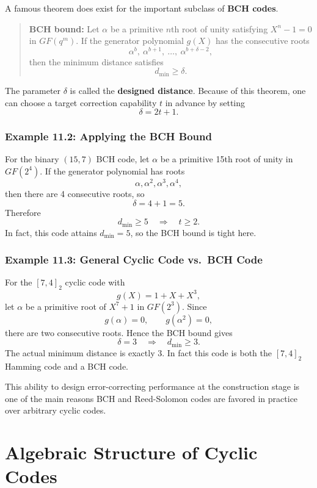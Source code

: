 \documentclass[11pt,oneside]{book}
\theoremstyle{plain}
\theoremstyle{definition}
\theoremstyle{remark}
\begin{document}
A famous theorem does exist for the important subclass of \textbf{BCH
codes}.

\begin{quote}
\textbf{BCH bound:} Let \(\alpha\) be a primitive \(n\)th root of unity
satisfying \(X^n-1=0\) in \(GF(q^m)\). If the generator polynomial
\(g(X)\) has the consecutive roots
\[\alpha^b,\ \alpha^{b+1},\ \dots,\ \alpha^{b+\delta-2},\] then the
minimum distance satisfies \[d_{\min} \ge \delta.\]
\end{quote}

The parameter \(\delta\) is called the \textbf{designed distance}.
Because of this theorem, one can choose a target correction capability
\(t\) in advance by setting \[\delta = 2t+1.\]

\subsubsection{Example 11.2: Applying the BCH
Bound}\label{example-11.2-applying-the-bch-bound}

For the binary \((15,7)\) BCH code, let \(\alpha\) be a primitive 15th
root of unity in \(GF(2^4)\). If the generator polynomial has roots
\[\alpha, \alpha^2, \alpha^3, \alpha^4,\] then there are 4 consecutive
roots, so \[\delta = 4+1 = 5.\] Therefore
\[d_{\min} \ge 5 \quad \Rightarrow \quad t \ge 2.\] In fact, this code
attains \(d_{\min}=5\), so the BCH bound is tight here.

\subsubsection{Example 11.3: General Cyclic Code vs.~BCH
Code}\label{example-11.3-general-cyclic-code-vs.-bch-code}

For the \([7,4]_2\) cyclic code with \[g(X)=1+X+X^3,\] let \(\alpha\) be
a primitive root of \(X^7+1\) in \(GF(2^3)\). Since
\[g(\alpha)=0, \qquad g(\alpha^2)=0,\] there are two consecutive roots.
Hence the BCH bound gives
\[\delta=3 \quad \Rightarrow \quad d_{\min} \ge 3.\] The actual minimum
distance is exactly 3. In fact this code is both the \([7,4]_2\) Hamming
code and a BCH code.

This ability to design error-correcting performance at the construction
stage is one of the main reasons BCH and Reed-Solomon codes are favored
in practice over arbitrary cyclic codes.


\section{Algebraic Structure of Cyclic Codes}\label{sec:algebraic-structure}
\end{document}
